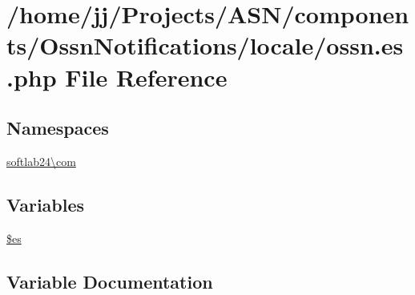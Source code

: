 \hypertarget{components_2_ossn_notifications_2locale_2ossn_8es_8php}{}\section{/home/jj/\+Projects/\+A\+S\+N/components/\+Ossn\+Notifications/locale/ossn.es.\+php File Reference}
\label{components_2_ossn_notifications_2locale_2ossn_8es_8php}
\subsection*{Namespaces}
\begin{DoxyCompactItemize}
\item 
 \hyperlink{namespacesoftlab24_1_1com}{softlab24\textbackslash{}com}
\end{DoxyCompactItemize}
\subsection*{Variables}
\begin{DoxyCompactItemize}
\item 
\hyperlink{components_2_ossn_notifications_2locale_2ossn_8es_8php_a388cbda27103d2baee3997798d1f2744}{\$es}
\end{DoxyCompactItemize}


\subsection{Variable Documentation}
